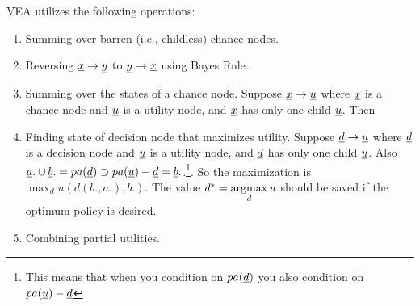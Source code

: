 VEA utilizes the following operations:
\begin{enumerate}
\item Summing over barren (i.e., childless) chance nodes.
\item Reversing $\rvx\rarrow \rvy$
to $\rvy\rarrow \rvx$
using Bayes Rule.
\beq
{}
\eeq

\item Summing over the states of a chance node. Suppose
$\rvx\rarrow \rvu$
where $\rvx$ is a chance node and $\rvu$
is a utility node, and $\rvx$ has only one child $\rvu$. Then
\beq
{}
\eeq

\item Finding state of decision node that maximizes utility.
Suppose $\rvd\rarrow \rvu$
where $\rvd$ is a decision node and $\rvu$
is a utility node, and $\rvd$ has only
one child $\rvu$. Also
$\rva.\cup\rvb.=pa(\rvd)\supset pa(\rvu)-\rvd=\rvb.$.\footnote{
This means that when you condition on
$pa(\rvd)$ you also
condition on $pa(\rvu)-\rvd$}. So the
maximization is $\max_du (d(b., a.), b.)$.
The value $d^*=\mathop{\mathrm{argmax}}\limits_d u$
should be saved
if the optimum policy is desired.

\beq
{}
\eeq

\item Combining partial
utilities.
\beq
{}
\eeq
\end{enumerate}

